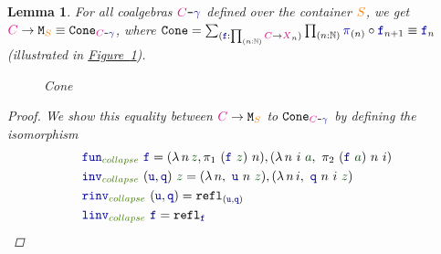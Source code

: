 \documentclass[twoside,11pt,openright]{report}
\theoremstyle{plain} %
\newtheorem{lem}[thm]{Lemma}
\theoremstyle{definition}
\theoremstyle{remark}
\newcommand*{\figref}[1]{\hyperref[fig:#1]{Figure~\ref*{fig:#1}}}
\newcommand*{\term}[1]{\textcolor{green!30!black}{#1}} %
\newcommand*{\pathterm}[1]{\textcolor{green!65!red!75!black}{#1}}
\newcommand*{\type}[1]{\textcolor{magenta!90!black}{#1}}
\newcommand*{\container}[1]{\textcolor{orange}{#1}}
\newcommand*{\coalg}[2]{#1\texttt{-}#2}
\newcommand*{\function}[1]{\textcolor{blue!60!black}{\ensuremath{\mathtt{#1}}}}
\newcommand*{\typeformer}[1]{\ensuremath{\mathtt{#1}}}
\begin{document}
\begin{lem}\label{lem:function-to-M-type-is-cone}
  For all coalgebras \(\coalg{\type{C}}{\function{\gamma}}\) defined over the container \(\container{S}\), we get \(\type{C} \rightarrow \typeformer{M}_{\container{S}} \equiv \typeformer{Cone}_{\coalg{\type{C}}{\function{\gamma}}}\), where \(\typeformer{Cone} = \sum_{(\function{f} : \prod_{(n : \mathbb{N})} \type{C} \rightarrow \type{X}_n)} \prod_{(n : \mathbb{N})} \function{\pi}_{(n)} \circ \function{f}_{n+1} \equiv \function{f}_n\) (illustrated in \figref{M-seq-cone}).
  \begin{figure}[h]
    \centering
    \caption{Cone}
    \label{fig:M-seq-cone}
  \end{figure}  
  \begin{proof}
    We show this equality between \(\type{C} \rightarrow \typeformer{M}_{\container{S}}\) to \(\typeformer{Cone}_{\coalg{\type{C}}{\function{\gamma}}}\) by defining the isomorphism
    \begin{align}
      &\function{fun}_{\pathterm{collapse}}~\function{f} = (\lambda\,n\,\term{z},\pi_1~(\function{f}~\term{z})~n),(\lambda\,n~i~\term{a},~\pi_2~(\function{f}~\term{a})~n~i) \\
      &\function{inv}_{\pathterm{collapse}}~(\function{u},\function{q})~\term{z} = (\lambda\,n,~\function{u}~n~\term{z}),(\lambda\,n\,i,~\function{q}~n~i~\term{z}) \\
      &\function{rinv}_{\pathterm{collapse}}~(\function{u},\function{q}) = \mathtt{refl}_{(\function{u},\function{q})} \\
      &\function{linv}_{\pathterm{collapse}}~\function{f} = \mathtt{refl}_{\function{f}}
    \end{align}
  \end{proof}
\end{lem}
\end{document}
